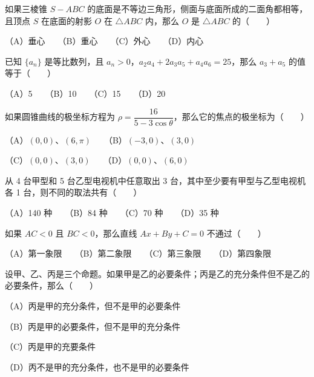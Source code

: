 \begin{question}

如果三棱锥 $S-ABC$ 的底面是不等边三角形，侧面与底面所成的二面角都相等，且顶点 $S$ 在底面的射影 $O$ 在 $\triangle ABC$ 内，那么 $O$ 是 $\triangle ABC$ 的\mbox{（　　）}

（A）垂心　　（B）重心　　（C）外心　　（D）内心

\end{question}
\begin{question}

已知 $\{a_n\}$ 是等比数列，且 $a_n>0$，$a_2a_4+2a_3a_5+a_4a_6=25$，那么 $a_3+a_5$ 的值等于\mbox{（　　）}

（A）5　　（B）10　　（C）15　　（D）20

\end{question}
\begin{question}

如果圆锥曲线的极坐标方程为 $\rho=\dfrac{16}{5-3\cos\theta}$，那么它的焦点的极坐标为\mbox{（　　）}

（A）$(0,0)$、$(6,\pi)$　　（B）$(-3,0)$、$(3,0)$

（C）$(0,0)$、$(3,0)$　　（D）$(0,0)$、$(6,0)$

\end{question}
\begin{question}

从 4 台甲型和 5 台乙型电视机中任意取出 3 台，其中至少要有甲型与乙型电视机各 1 台，则不同的取法共有\mbox{（　　）}

（A）140 种　　（B）84 种　　（C）70 种　　（D）35 种

\end{question}
\begin{question}

如果 $AC<0$ 且 $BC<0$，那么直线 $Ax+By+C=0$ 不通过\mbox{（　　）}

（A）第一象限　　（B）第二象限　　（C）第三象限　　（D）第四象限

\end{question}
\begin{question}

设甲、乙、丙是三个命题。如果甲是乙的必要条件；丙是乙的充分条件但不是乙的必要条件，那么\mbox{（　　）}

（A）丙是甲的充分条件，但不是甲的必要条件

（B）丙是甲的必要条件，但不是甲的充分条件

（C）丙是甲的充要条件

（D）丙不是甲的充分条件，也不是甲的必要条件

\end{question}
